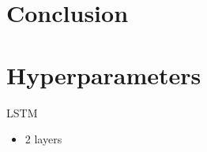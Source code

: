 \documentclass[11pt,a4paper]{article}
\begin{document}

\section{Conclusion}




\appendix

\section{Hyperparameters}
\label{sec:hyperparams}
LSTM
\begin{itemize}
\item 2 layers
\end{itemize}
\end{document}
